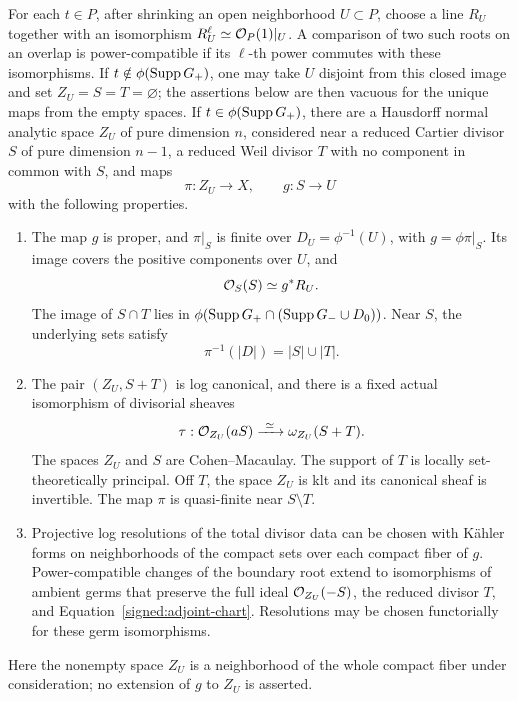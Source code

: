 \begin{lemma}\label{signed:root-charts}
For each \(t\in P\), after shrinking an open neighborhood
\(U\subset P\), choose a line \(R_U\) together with an isomorphism
\(R_U^\ell\simeq\mathcal O_P(1)|_U\).  A comparison of two such roots on an
overlap is power-compatible if its \(\ell\)-th power commutes with these
isomorphisms.  If
\(t\notin\phi(\operatorname{Supp} G_+)\), one may take \(U\) disjoint from this
closed image and set \(Z_U=S=T=\varnothing\); the assertions below are
then vacuous for the unique maps from the empty spaces.  If
\(t\in\phi(\operatorname{Supp} G_+)\), there are a Hausdorff normal
analytic space \(Z_U\) of pure dimension \(n\), considered near a
reduced Cartier divisor \(S\) of pure dimension \(n-1\), a
reduced Weil divisor \(T\) with no component in common
with \(S\), and maps
\[
 \pi:Z_U\longrightarrow X,\qquad g:S\longrightarrow U
\]
with the following properties.
\begin{enumerate}
\item The map \(g\) is proper, and \(\pi|_S\) is finite over
\(D_U=\phi^{-1}(U)\), with \(g=\phi\pi|_S\).  Its image covers
the positive components over \(U\), and
\[
 \mathcal O_S(S)\simeq g^*R_U.
\]
The image of \(S\cap T\) lies in
\(\phi(\operatorname{Supp} G_+\cap(\operatorname{Supp} G_-\cup D_0))\).
Near \(S\), the underlying sets satisfy
\[
 \pi^{-1}(|D|)=|S|\cup|T|.
\]
\item The pair \((Z_U,S+T)\) is log canonical, and there is a fixed
actual isomorphism of divisorial sheaves
\begin{equation}\label{signed:adjoint-chart}
 \tau:\mathcal O_{Z_U}(aS)\xrightarrow{\ \simeq\ }\omega_{Z_U}(S+T).
\end{equation}
The spaces \(Z_U\) and \(S\) are Cohen--Macaulay.  The support
of \(T\) is locally set-theoretically principal.
Off \(T\), the space \(Z_U\) is klt and its canonical sheaf is
invertible.  The map \(\pi\) is quasi-finite near \(S\setminus T\).
\item Projective log resolutions of the total divisor data can be
chosen with Kähler forms on neighborhoods of the compact sets over
each compact fiber of \(g\).  Power-compatible changes of the
boundary root extend to isomorphisms of ambient germs that preserve
the full ideal \(\mathcal O_{Z_U}(-S)\), the reduced divisor \(T\), and
Equation~\eqref{signed:adjoint-chart}.  Resolutions may be chosen
functorially for these germ isomorphisms.
\end{enumerate}
Here the nonempty space \(Z_U\) is a neighborhood of the whole compact
fiber under consideration; no extension of \(g\) to \(Z_U\) is asserted.
\end{lemma}


